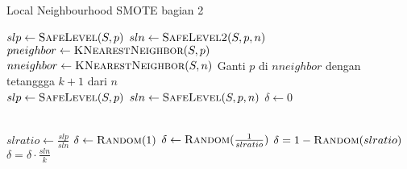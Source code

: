 \begin{algorithm}[h]
	\caption{Local Neighbourhood SMOTE bagian 2}
	\begin{algorithmic}[1]

	\State $ slp \gets \Call{SafeLevel}{S, p} $
	\State $ sln \gets \Call{SafeLevel2}{S, p, n} $
	\State {}
\EndFunction
\\
	\State $ pneighbor \gets \Call{KNearestNeighbor}{S, p} $
	\State {}
\EndFunction
\\
	\State $ nneighbor \gets \Call{KNearestNeighbor}{ S, n } $
		\State Ganti $ p $ di $ nneighbor $ dengan tetanggga $ k + 1 $
		dari $ n $
	\EndIf
	\State {}
\EndFunction
\\
	\State $ slp \gets \Call{SafeLevel}{S, p} $
	\State $ sln \gets \Call{SafeLevel}{S, p, n} $
	\State $ \delta \gets 0 $

		\State \Return{$ \delta $}
	\EndIf
	\\
	\State $ slratio \gets \frac{slp}{sln} $
		\State $ \delta \gets \Call{Random}{1} $
		\State $ \delta \gets \Call{Random}{\frac{1}{slratio}} $
	\Else
		\State $ \delta = 1 - \Call{Random}{slratio} $
	\EndIf
	\\
		\State $ \delta = \delta \cdot \frac{sln}{k} $
	\EndIf
	\\
	\State \Return{$ \delta $}
\EndFunction
	\end{algorithmic}
\end{algorithm}
